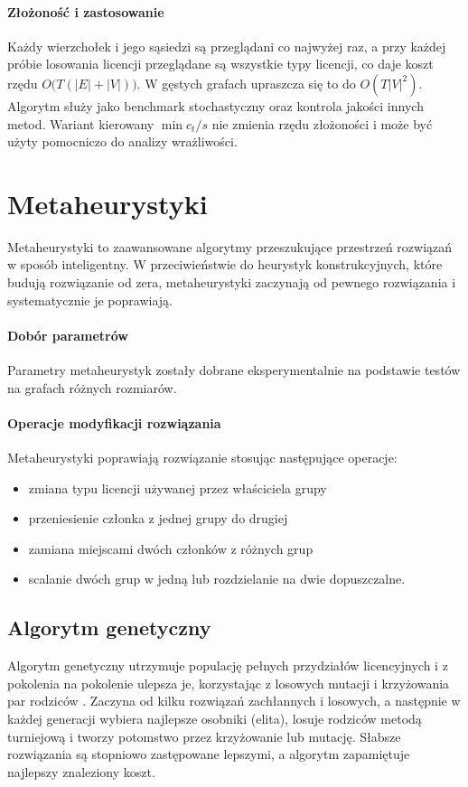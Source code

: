 \paragraph{Złożoność i zastosowanie}
Każdy wierzchołek i jego sąsiedzi są przeglądani co najwyżej raz, a przy każdej próbie losowania licencji przeglądane są wszystkie typy licencji, co daje koszt rzędu \(O\bigl(T(|E|+|V|)\bigr)\).
W gęstych grafach upraszcza się to do \(O(T|V|^2)\).
Algorytm służy jako benchmark stochastyczny oraz kontrola jakości innych metod.
Wariant kierowany \(\min c_t/s\) nie zmienia rzędu złożoności i może być użyty pomocniczo do analizy wrażliwości.


\section{Metaheurystyki}

Metaheurystyki to zaawansowane algorytmy przeszukujące przestrzeń rozwiązań w sposób inteligentny. W przeciwieństwie do heurystyk konstrukcyjnych, które budują rozwiązanie od zera, metaheurystyki zaczynają od pewnego rozwiązania i systematycznie je poprawiają.

\paragraph{Dobór parametrów}
Parametry metaheurystyk zostały dobrane eksperymentalnie na podstawie testów na grafach różnych rozmiarów.

\paragraph{Operacje modyfikacji rozwiązania}
Metaheurystyki poprawiają rozwiązanie stosując następujące operacje:
\begin{itemize}
  \item zmiana typu licencji używanej przez właściciela grupy
  \item przeniesienie członka z jednej grupy do drugiej
  \item zamiana miejscami dwóch członków z różnych grup
  \item scalanie dwóch grup w jedną lub rozdzielanie na dwie dopuszczalne.
\end{itemize}

\subsection{Algorytm genetyczny}\label{subsec:ga}
Algorytm genetyczny utrzymuje populację pełnych przydziałów licencyjnych i z pokolenia na pokolenie ulepsza je, korzystając z losowych mutacji i krzyżowania par rodziców \cite{holland1975,goldberg1989}. Zaczyna od kilku rozwiązań zachłannych i losowych, a następnie w każdej generacji wybiera najlepsze osobniki (elita), losuje rodziców metodą turniejową i tworzy potomstwo przez krzyżowanie lub mutację. Słabsze rozwiązania są stopniowo zastępowane lepszymi, a algorytm zapamiętuje najlepszy znaleziony koszt.

